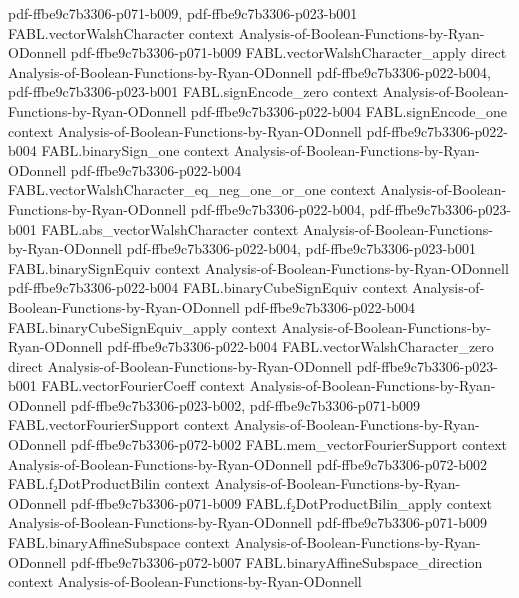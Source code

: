 \begin{theorem}
  {pdf-ffbe9c7b3306-p071-b009,
    pdf-ffbe9c7b3306-p023-b001}
\proofstep
  {FABL.vectorWalshCharacter}
  {context}
  {Analysis-of-Boolean-Functions-by-Ryan-ODonnell}
  {pdf-ffbe9c7b3306-p071-b009}
\proofstep
  {FABL.vectorWalshCharacter_apply}
  {direct}
  {Analysis-of-Boolean-Functions-by-Ryan-ODonnell}
  {pdf-ffbe9c7b3306-p022-b004,
    pdf-ffbe9c7b3306-p023-b001}
\proofstep
  {FABL.signEncode_zero}
  {context}
  {Analysis-of-Boolean-Functions-by-Ryan-ODonnell}
  {pdf-ffbe9c7b3306-p022-b004}
\proofstep
  {FABL.signEncode_one}
  {context}
  {Analysis-of-Boolean-Functions-by-Ryan-ODonnell}
  {pdf-ffbe9c7b3306-p022-b004}
\proofstep
  {FABL.binarySign_one}
  {context}
  {Analysis-of-Boolean-Functions-by-Ryan-ODonnell}
  {pdf-ffbe9c7b3306-p022-b004}
\proofstep
  {FABL.vectorWalshCharacter_eq_neg_one_or_one}
  {context}
  {Analysis-of-Boolean-Functions-by-Ryan-ODonnell}
  {pdf-ffbe9c7b3306-p022-b004,
    pdf-ffbe9c7b3306-p023-b001}
\proofstep
  {FABL.abs_vectorWalshCharacter}
  {context}
  {Analysis-of-Boolean-Functions-by-Ryan-ODonnell}
  {pdf-ffbe9c7b3306-p022-b004,
    pdf-ffbe9c7b3306-p023-b001}
\proofstep
  {FABL.binarySignEquiv}
  {context}
  {Analysis-of-Boolean-Functions-by-Ryan-ODonnell}
  {pdf-ffbe9c7b3306-p022-b004}
\proofstep
  {FABL.binaryCubeSignEquiv}
  {context}
  {Analysis-of-Boolean-Functions-by-Ryan-ODonnell}
  {pdf-ffbe9c7b3306-p022-b004}
\proofstep
  {FABL.binaryCubeSignEquiv_apply}
  {context}
  {Analysis-of-Boolean-Functions-by-Ryan-ODonnell}
  {pdf-ffbe9c7b3306-p022-b004}
\proofstep
  {FABL.vectorWalshCharacter_zero}
  {direct}
  {Analysis-of-Boolean-Functions-by-Ryan-ODonnell}
  {pdf-ffbe9c7b3306-p023-b001}
\proofstep
  {FABL.vectorFourierCoeff}
  {context}
  {Analysis-of-Boolean-Functions-by-Ryan-ODonnell}
  {pdf-ffbe9c7b3306-p023-b002,
    pdf-ffbe9c7b3306-p071-b009}
\proofstep
  {FABL.vectorFourierSupport}
  {context}
  {Analysis-of-Boolean-Functions-by-Ryan-ODonnell}
  {pdf-ffbe9c7b3306-p072-b002}
\proofstep
  {FABL.mem_vectorFourierSupport}
  {context}
  {Analysis-of-Boolean-Functions-by-Ryan-ODonnell}
  {pdf-ffbe9c7b3306-p072-b002}
\proofstep
  {FABL.f₂DotProductBilin}
  {context}
  {Analysis-of-Boolean-Functions-by-Ryan-ODonnell}
  {pdf-ffbe9c7b3306-p071-b009}
\proofstep
  {FABL.f₂DotProductBilin_apply}
  {context}
  {Analysis-of-Boolean-Functions-by-Ryan-ODonnell}
  {pdf-ffbe9c7b3306-p071-b009}
\proofstep
  {FABL.binaryAffineSubspace}
  {context}
  {Analysis-of-Boolean-Functions-by-Ryan-ODonnell}
  {pdf-ffbe9c7b3306-p072-b007}
\proofstep
  {FABL.binaryAffineSubspace_direction}
  {context}
  {Analysis-of-Boolean-Functions-by-Ryan-ODonnell}

\end{theorem}
